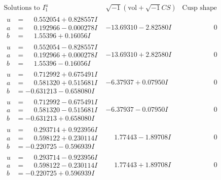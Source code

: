 \documentclass[1p]{elsarticle_modified}
\theoremstyle{definition}
\newcommand{\I}{\sqrt{-1}}
\begin{document}
$$\begin{array}{c|c|c}  
\text{Solutions to }I^u_{1}& \I (\text{vol} + \sqrt{-1}CS) & \text{Cusp shape}\\
 \hline 
\begin{aligned}
u &= \phantom{-}0.552054 + 0.828557 I \\
a &= \phantom{-}0.192966 - 0.000278 I \\
b &= \phantom{-}1.55396 + 0.16056 I\end{aligned}
 & -13.69310 - 2.82580 I & \phantom{-0.000000 } 0 \\ \hline\begin{aligned}
u &= \phantom{-}0.552054 - 0.828557 I \\
a &= \phantom{-}0.192966 + 0.000278 I \\
b &= \phantom{-}1.55396 - 0.16056 I\end{aligned}
 & -13.69310 + 2.82580 I & \phantom{-0.000000 } 0 \\ \hline\begin{aligned}
u &= \phantom{-}0.712992 + 0.675491 I \\
a &= \phantom{-}0.581320 + 0.515681 I \\
b &= -0.631213 - 0.658080 I\end{aligned}
 & -6.37937 + 0.07950 I & \phantom{-0.000000 } 0 \\ \hline\begin{aligned}
u &= \phantom{-}0.712992 - 0.675491 I \\
a &= \phantom{-}0.581320 - 0.515681 I \\
b &= -0.631213 + 0.658080 I\end{aligned}
 & -6.37937 - 0.07950 I & \phantom{-0.000000 } 0 \\ \hline\begin{aligned}
u &= \phantom{-}0.293714 + 0.923956 I \\
a &= \phantom{-}0.598122 + 0.230114 I \\
b &= -0.220725 - 0.596939 I\end{aligned}
 & \phantom{-}1.77443 - 1.89708 I & \phantom{-0.000000 } 0 \\ \hline\begin{aligned}
u &= \phantom{-}0.293714 - 0.923956 I \\
a &= \phantom{-}0.598122 - 0.230114 I \\
b &= -0.220725 + 0.596939 I\end{aligned}
 & \phantom{-}1.77443 + 1.89708 I & \phantom{-0.000000 } 0 \\ \hline\begin{aligned}

\end{aligned}
\end{array}$$
\end{document}
